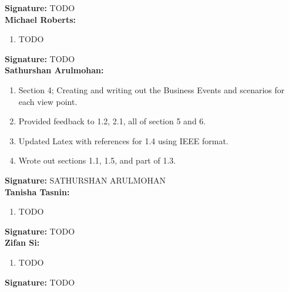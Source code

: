 \documentclass[]{article}
\begin{document}
\textbf{Signature:} TODO \\

\textbf{Michael Roberts:}
\begin{enumerate}
	\item TODO
\end{enumerate}

\textbf{Signature:} TODO \\

\textbf{Sathurshan Arulmohan:}
\begin{enumerate}
	\item Section 4; Creating and writing out the Business Events and scenarios for each view point.
	\item Provided feedback to 1.2, 2.1, all of section 5 and 6.
	\item Updated Latex with references for 1.4 using IEEE format.
	\item Wrote out sections 1.1, 1.5, and part of 1.3.
\end{enumerate}

\textbf{Signature:} SATHURSHAN ARULMOHAN \\

\textbf{Tanisha Tasnin:}
\begin{enumerate}
	\item TODO
\end{enumerate}

\textbf{Signature:} TODO \\

\textbf{Zifan Si:}
\begin{enumerate}
	\item TODO
\end{enumerate}

\textbf{Signature:} TODO \\

\end{document}
